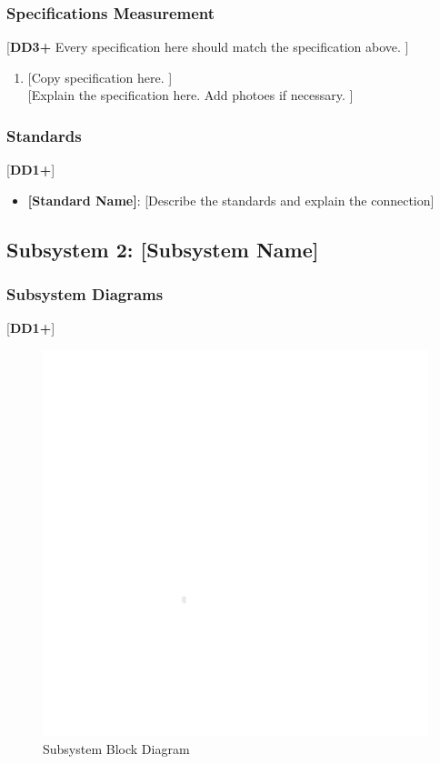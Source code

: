 \documentclass[letterpaper, 11pt]{article}
\begin{document}
\subsubsection{Specifications Measurement}
[\textbf{DD3+} Every specification here should match the specification above. ]
\begin{enumerate}
    \item {[Copy specification here. ]} \\
          {[Explain the specification here. Add photoes if necessary. ]}
\end{enumerate}

\subsubsection{Standards}
[\textbf{DD1+}]
\begin{itemize}
    \item \textbf{[Standard Name]}: [Describe the standards and explain the connection]
\end{itemize}

\clearpage
\subsection{Subsystem 2: [Subsystem Name]}

\subsubsection{Subsystem Diagrams}
[\textbf{DD1+}]
\begin{figure}[h]
    \centering
    \includegraphics[width=16cm]{images/white.png} %
    \caption{Subsystem Block Diagram}
\end{figure} %
\end{document}
